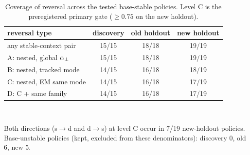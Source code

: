 \begin{table}[!t]
\centering
\caption{Coverage of reversal across the tested base-stable policies. Level C is the preregistered primary gate ($\ge 0.75$ on the new holdout).}\label{tab:nested}
\footnotesize
\begin{tabular}{@{}lccc@{}}
\toprule
reversal type & discovery & old holdout & new holdout \\
\midrule
any stable-context pair & 15/15 & 18/18 & 19/19 \\
A: nested, global $\alpha_{\perp}$ & 15/15 & 18/18 & 19/19 \\
B: nested, tracked mode & 14/15 & 16/18 & 18/19 \\
C: nested, EM same mode & 14/15 & 16/18 & 17/19 \\
D: C + same family & 14/15 & 16/18 & 17/19 \\
\bottomrule
\end{tabular}\\[2pt]
\parbox{\columnwidth}{\scriptsize Both directions (s$\to$d and d$\to$s) at level C occur in 7/19 new-holdout policies. Base-unstable policies (kept, excluded from these denominators): discovery 0, old 6, new 5.}
\end{table}
